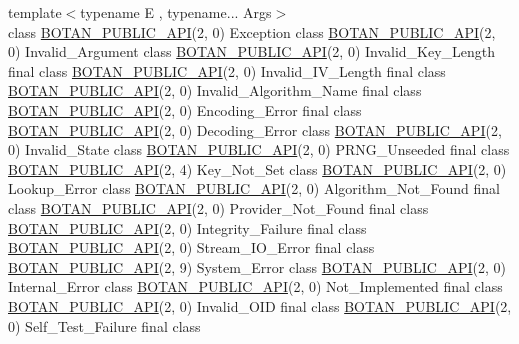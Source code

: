 \begin{DoxyCompactItemize}
{\footnotesize template$<$typename E , typename... Args$>$ }\\class \hyperlink{namespace_botan_a6b9388030d872e586a4655b776ac9501}{B\+O\+T\+A\+N\+\_\+\+P\+U\+B\+L\+I\+C\+\_\+\+A\+PI}(2, 0) Exception class \hyperlink{namespace_botan_a6b9388030d872e586a4655b776ac9501}{B\+O\+T\+A\+N\+\_\+\+P\+U\+B\+L\+I\+C\+\_\+\+A\+PI}(2, 0) Invalid\+\_\+\+Argument class \hyperlink{namespace_botan_a6b9388030d872e586a4655b776ac9501}{B\+O\+T\+A\+N\+\_\+\+P\+U\+B\+L\+I\+C\+\_\+\+A\+PI}(2, 0) Invalid\+\_\+\+Key\+\_\+\+Length final class \hyperlink{namespace_botan_a6b9388030d872e586a4655b776ac9501}{B\+O\+T\+A\+N\+\_\+\+P\+U\+B\+L\+I\+C\+\_\+\+A\+PI}(2, 0) Invalid\+\_\+\+I\+V\+\_\+\+Length final class \hyperlink{namespace_botan_a6b9388030d872e586a4655b776ac9501}{B\+O\+T\+A\+N\+\_\+\+P\+U\+B\+L\+I\+C\+\_\+\+A\+PI}(2, 0) Invalid\+\_\+\+Algorithm\+\_\+\+Name final class \hyperlink{namespace_botan_a6b9388030d872e586a4655b776ac9501}{B\+O\+T\+A\+N\+\_\+\+P\+U\+B\+L\+I\+C\+\_\+\+A\+PI}(2, 0) Encoding\+\_\+\+Error final class \hyperlink{namespace_botan_a6b9388030d872e586a4655b776ac9501}{B\+O\+T\+A\+N\+\_\+\+P\+U\+B\+L\+I\+C\+\_\+\+A\+PI}(2, 0) Decoding\+\_\+\+Error class \hyperlink{namespace_botan_a6b9388030d872e586a4655b776ac9501}{B\+O\+T\+A\+N\+\_\+\+P\+U\+B\+L\+I\+C\+\_\+\+A\+PI}(2, 0) Invalid\+\_\+\+State class \hyperlink{namespace_botan_a6b9388030d872e586a4655b776ac9501}{B\+O\+T\+A\+N\+\_\+\+P\+U\+B\+L\+I\+C\+\_\+\+A\+PI}(2, 0) P\+R\+N\+G\+\_\+\+Unseeded final class \hyperlink{namespace_botan_a6b9388030d872e586a4655b776ac9501}{B\+O\+T\+A\+N\+\_\+\+P\+U\+B\+L\+I\+C\+\_\+\+A\+PI}(2, 4) Key\+\_\+\+Not\+\_\+\+Set class \hyperlink{namespace_botan_a6b9388030d872e586a4655b776ac9501}{B\+O\+T\+A\+N\+\_\+\+P\+U\+B\+L\+I\+C\+\_\+\+A\+PI}(2, 0) Lookup\+\_\+\+Error class \hyperlink{namespace_botan_a6b9388030d872e586a4655b776ac9501}{B\+O\+T\+A\+N\+\_\+\+P\+U\+B\+L\+I\+C\+\_\+\+A\+PI}(2, 0) Algorithm\+\_\+\+Not\+\_\+\+Found final class \hyperlink{namespace_botan_a6b9388030d872e586a4655b776ac9501}{B\+O\+T\+A\+N\+\_\+\+P\+U\+B\+L\+I\+C\+\_\+\+A\+PI}(2, 0) Provider\+\_\+\+Not\+\_\+\+Found final class \hyperlink{namespace_botan_a6b9388030d872e586a4655b776ac9501}{B\+O\+T\+A\+N\+\_\+\+P\+U\+B\+L\+I\+C\+\_\+\+A\+PI}(2, 0) Integrity\+\_\+\+Failure final class \hyperlink{namespace_botan_a6b9388030d872e586a4655b776ac9501}{B\+O\+T\+A\+N\+\_\+\+P\+U\+B\+L\+I\+C\+\_\+\+A\+PI}(2, 0) Stream\+\_\+\+I\+O\+\_\+\+Error final class \hyperlink{namespace_botan_a6b9388030d872e586a4655b776ac9501}{B\+O\+T\+A\+N\+\_\+\+P\+U\+B\+L\+I\+C\+\_\+\+A\+PI}(2, 9) System\+\_\+\+Error class \hyperlink{namespace_botan_a6b9388030d872e586a4655b776ac9501}{B\+O\+T\+A\+N\+\_\+\+P\+U\+B\+L\+I\+C\+\_\+\+A\+PI}(2, 0) Internal\+\_\+\+Error class \hyperlink{namespace_botan_a6b9388030d872e586a4655b776ac9501}{B\+O\+T\+A\+N\+\_\+\+P\+U\+B\+L\+I\+C\+\_\+\+A\+PI}(2, 0) Not\+\_\+\+Implemented final class \hyperlink{namespace_botan_a6b9388030d872e586a4655b776ac9501}{B\+O\+T\+A\+N\+\_\+\+P\+U\+B\+L\+I\+C\+\_\+\+A\+PI}(2, 0) Invalid\+\_\+\+O\+ID final class \hyperlink{namespace_botan_a6b9388030d872e586a4655b776ac9501}{B\+O\+T\+A\+N\+\_\+\+P\+U\+B\+L\+I\+C\+\_\+\+A\+PI}(2, 0) Self\+\_\+\+Test\+\_\+\+Failure final class 
\end{DoxyCompactItemize}

